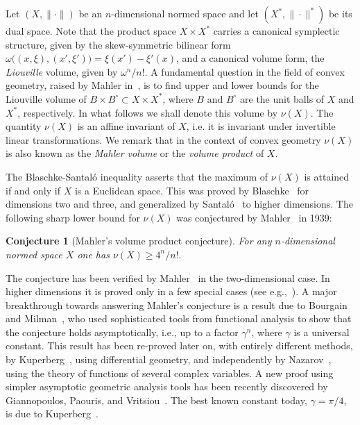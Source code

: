 \documentclass{icmart}
\newtheorem{conjecture}[theorem]{Conjecture}
\theoremstyle{definition}
\begin{document}
Let $(X,\| \cdot \|)$ be an $n$-dimensional normed space and let
$(X^*,\| \cdot \|^*)$  be its dual space. Note that the product space $X
\times X^*$ carries a canonical symplectic structure, given by the
skew-symmetric bilinear form $\omega \bigl ( (x,\xi),(x',\xi') \bigr
) = \xi(x')-\xi'(x)$, and a canonical volume form, the {\it
Liouville} volume, given by $ \omega^n/n!$. A fundamental question
in the field of convex geometry, raised by Mahler in~\cite{Ma}, is to find  upper and lower bounds for the
Liouville volume of $B \times B^{\circ} \subset X \times X^*$, where
$B$ and $B^{\circ}$ are the unit balls of $X$ and $X^*$,
respectively. In what follows we shall denote this volume by
$\nu(X)$. 
The quantity $\nu(X)$ is an affine invariant of $X$, i.e. it
is invariant under invertible linear transformations. We remark that
in the context of convex geometry $\nu(X)$ is also known as the
{\it Mahler volume} or the {\it volume product} of $X$.

\smallskip




The Blaschke-Santal\'o inequality asserts that the maximum of
$\nu(X)$ is attained if and only if $X$ is a Euclidean space. This
was proved by Blaschke~\cite{Bl} for dimensions two and three, and
generalized by Santal\'o~\cite{Sa} to higher dimensions. 
The following sharp lower bound for $\nu(X)$ was
conjectured by Mahler~\cite{Ma} in 1939:



\begin{conjecture}[Mahler's volume product conjecture]\label{Mahler-conj}
For any
$n$-dimensional normed space $X$ one has $\nu(X) \geq 4^n/n!.$ 
\end{conjecture}
%
%



The conjecture has been verified by Mahler~\cite{Ma} in the
two-dimensional case. In higher dimensions it is proved only in
a few special cases (see e.g.,~\cite{GMR,Kim,ME1,NPRZ, R1,R2, RSW,SR, St}). 
%
%
A major breakthrough towards answering Mahler's conjecture is a result 
due to Bourgain and Milman~\cite{BM}, who used sophisticated tools from functional analysis to
show that the conjecture holds asymptotically, i.e., up to a factor
$\gamma^n$, where $\gamma$ is a universal constant. 
This result has been re-proved later on, with entirely different methods, by Kuperberg~\cite{Ku}, using differential geometry, 
and independently by Nazarov~\cite{Naz},  using the theory of functions of several complex variables. A new proof using simpler asymptotic geometric analysis tools has been recently discovered by Giannopoulos, Paouris, and Vritsiou~\cite{GPV}. 
The best known constant today, $\gamma = \pi/4$, is due to Kuperberg~\cite{Ku}.
\end{document}
